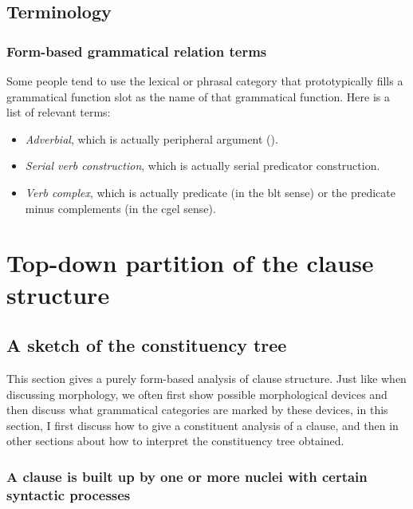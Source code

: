 \documentclass{article}
\newcommand*{\term}[1]{\emph{#1}}
\begin{document}
\subsection{Terminology}

\subsubsection{Form-based grammatical relation terms}\label{sec:form-based-function-name}

Some people tend to use the lexical or phrasal category 
that prototypically fills a grammatical function slot 
as the name of that grammatical function.
Here is a list of relevant terms:
\begin{itemize}
    \item \term{Adverbial}, which is actually peripheral argument ().
    \item \term{Serial verb construction}, which is actually serial predicator construction.
    \item \term{Verb complex}, which is actually predicate (in the \ac{blt} sense) 
    or the predicate minus complements (in the \ac{cgel} sense).
\end{itemize}

\section{Top-down partition of the clause structure}

\subsection{A sketch of the constituency tree}\label{sec:ica-clause}

This section gives a purely form-based analysis of clause structure.
Just like when discussing morphology,
we often first show possible morphological devices 
and then discuss what grammatical categories are marked by these devices,
in this section, I first discuss how to give a constituent analysis of a clause,
and then in other sections about how to interpret the constituency tree obtained.

\subsubsection{A clause is built up by one or more nuclei with certain syntactic processes}\label{sec:nucleus-to-clause}
\end{document}
